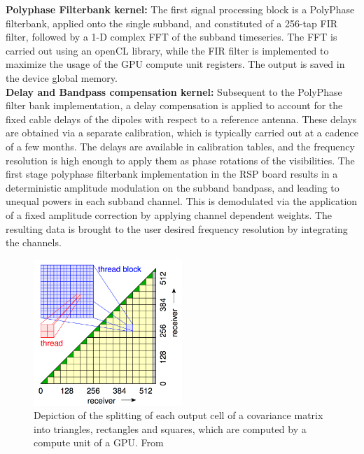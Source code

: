 \documentclass{ws-jai}
\begin{document}
\noindent  \textbf {Polyphase  Filterbank kernel:}  The first  signal processing
block  is  a  PolyPhase  filterbank,   applied  onto  the  single  subband,  and
constituted  of a  256-tap FIR  filter, followed  by a  1-D complex  FFT of  the
subband timeseries.  The FFT is carried  out using an openCL  library, while the
FIR  filter  is implemented  to  maximize  the usage  of  the  GPU compute  unit
registers. The output is saved in the device global memory.\\

\noindent \textbf  {Delay and Bandpass  compensation kernel:} Subsequent  to the
PolyPhase filter bank implementation, a delay compensation is applied to account
for the fixed cable  delays of the dipoles with respect  to a reference antenna.
These delays are obtained via a separate calibration, which is typically carried
out at  a cadence  of a  few months.   The delays  are available  in calibration
tables,  and the  frequency resolution  is high  enough to  apply them  as phase
rotations   of  the   visibilities.   The  first   stage  polyphase   filterbank
implementation in the RSP board  results in a deterministic amplitude modulation
on the subband bandpass, and leading  to unequal powers in each subband channel.
This  is demodulated  via the  application of  a fixed  amplitude correction  by
applying channel  dependent weights. The resulting  data is brought to  the user
desired frequency resolution by integrating the channels.\\

\begin{figure}[htbp]
\centering
\includegraphics[width=0.5\textwidth]{Figs/ACM_spatial_split.png}
\caption {Depiction of the splitting of each output cell of a covariance matrix into triangles, rectangles and squares, which are computed by a compute unit of a GPU. From \cite{romein2016comparison}}
\label{fig:acm_spatial_split}
\end{figure}
\end{document}
